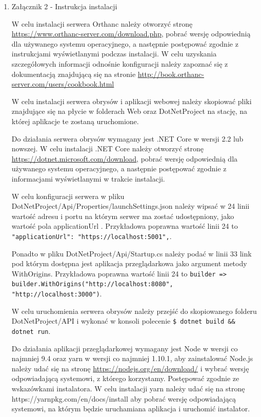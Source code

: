 \documentclass[a4paper,11pt,twoside,openright]{report}
\theoremstyle{definition}
\begin{document}
\begin{enumerate}
\item Załącznik 2 - Instrukcja instalacji

W celu instalacji serwera Orthanc należy otworzyć stronę
\url{https://www.orthanc-server.com/download.php}, pobrać wersję odpowiednią dla
używanego systemu operacyjnego, a następnie postępować zgodnie z instrukcjami
wyświetlanymi podczas instalacji. W celu uzyskania szczegółowych informacji
odnośnie konfiguracji należy zapoznać się z dokumentacją znajdującą się na stronie
\url{http://book.orthanc-server.com/users/cookbook.html}

W celu instalacji serwera obrysów i aplikacji webowej należy skopiować pliki
znajdujące się na płycie w folderach Web oraz DotNetProject na stację,
na której aplikacje te zostaną uruchomione.

Do działania serwera obrysów wymagany jest .NET Core w wersji 2.2 lub nowszej.
W celu instalacji .NET Core należy otworzyć stronę \url{https://dotnet.microsoft.com/download},
pobrać wersję odpowiednią dla używanego systemu operacyjnego, a następnie
postępować zgodnie z informacjami wyświetlanymi w trakcie instalacji.

W celu konfiguracji serwera w pliku DotNetProject/Api/Properties/launchSettings.json
należy wipsać w 24 linii  wartość adresu i portu na którym serwer ma zostać
udostępniony, jako wartość pola applicationUrl . Przykładowa poprawna wartość
linii 24 to\texttt{ "applicationUrl": "https://localhost:5001",}.

Ponadto w pliku DotNetProject/Api/Startup.cs należy podać w linii 33 link pod
którym dostępna jest aplikacja przeglądarkowa jako argument metody WithOrigins.
Przykładowa poprawna wartość linii 24 to
\texttt{builder => builder.WithOrigins("http://localhost:8080", "http://localhost:3000")}.

W celu uruchomienia serwera obrysów należy przejść do skopiowanego folderu
DotNetProject/API i wykonać w konsoli polecenie \texttt{\$ dotnet build \&\& dotnet run}.

Do działania aplikacji przeglądarkowej wymagany jest Node w wersji co najmniej
9.4 oraz yarn w wersji co najmniej 1.10.1, aby zainstalować Node.js należy udać
się na stronę \url{https://nodejs.org/en/download/} i wybrać wersję odpowiadającą
systemowi, z którego korzystamy. Postępować zgodnie ze wskazówkami instalatora.
W celu instalacji yarn należy udać się na stronę https://yarnpkg.com/en/docs/install
aby pobrać wersję odpowiadającą systemowi, na którym będzie uruchamiana aplikacja
i uruchomić instalator.


\end{enumerate}
\end{document}
